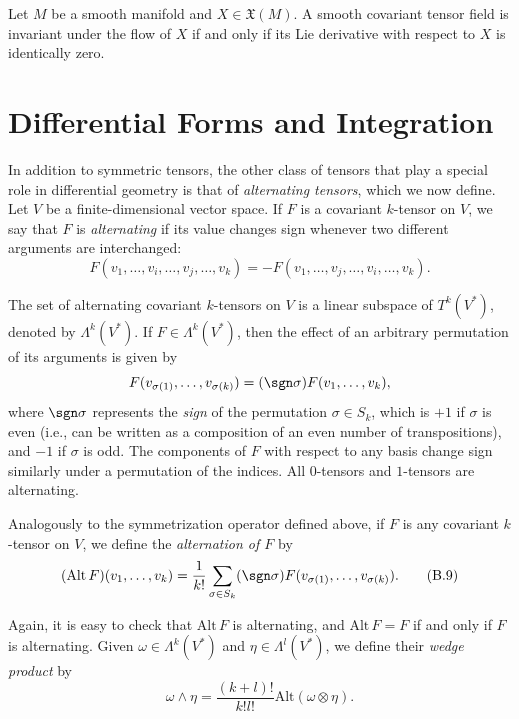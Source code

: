 \begin{proposition}
\label{prop:invariant-tensor-characterization}

Let $M$ be a smooth manifold and $X \in \mathfrak{X}(M)$. A smooth covariant tensor field is invariant under the flow of $X$ if and only if its Lie derivative with respect to $X$ is identically zero.
\end{proposition}

\section{Differential Forms and Integration}

In addition to symmetric tensors, the other class of tensors that play a special role in differential geometry is that of \textit{alternating tensors}, which we now define. Let $V$ be a finite-dimensional vector space. If $F$ is a covariant $k$-tensor on $V$, we say that $F$ is \textit{alternating} if its value changes sign whenever two different arguments are interchanged:
\[
F(v_1,\ldots,v_i,\ldots,v_j,\ldots,v_k) = -F(v_1,\ldots,v_j,\ldots,v_i,\ldots,v_k).
\]

The set of alternating covariant $k$-tensors on $V$ is a linear subspace of $T^k(V^*)$, denoted by $\Lambda^k(V^*)$. If $F \in \Lambda^k(V^*)$, then the effect of an arbitrary permutation of its arguments is given by
\[
F(v_{\sigma(1)},\ldots,v_{\sigma(k)}) = (\sgn \sigma)F(v_1,\ldots,v_k),
\]
where $\sgn \sigma$ represents the \textit{sign} of the permutation $\sigma \in S_k$, which is $+1$ if $\sigma$ is even (i.e., can be written as a composition of an even number of transpositions), and $-1$ if $\sigma$ is odd. The components of $F$ with respect to any basis change sign similarly under a permutation of the indices. All $0$-tensors and $1$-tensors are alternating.

Analogously to the symmetrization operator defined above, if $F$ is any covariant $k$-tensor on $V$, we define the \textit{alternation of $F$} by
\begin{equation}
(\mathrm{Alt}\, F)(v_1,\ldots,v_k) = \frac{1}{k!} \sum_{\sigma \in S_k} (\sgn \sigma) F(v_{\sigma(1)},\ldots,v_{\sigma(k)}).
\tag{B.9}
\end{equation}

Again, it is easy to check that $\mathrm{Alt}\, F$ is alternating, and $\mathrm{Alt}\, F = F$ if and only if $F$ is alternating. Given $\omega \in \Lambda^k(V^*)$ and $\eta \in \Lambda^l(V^*)$, we define their \textit{wedge product} by
\[
\omega \wedge \eta = \frac{(k+l)!}{k!l!} \mathrm{Alt}(\omega \otimes \eta).
\]


